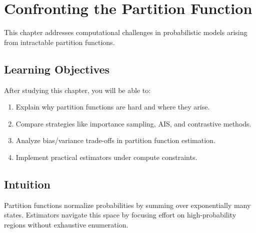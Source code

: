 
\chapter{Confronting the Partition Function}
\label{chap:partition-function}

This chapter addresses computational challenges in probabilistic models arising from intractable partition functions.


\section*{Learning Objectives}

After studying this chapter, you will be able to:

\begin{enumerate}
    \item Explain why partition functions are hard and where they arise.
    \item Compare strategies like importance sampling, AIS, and contrastive methods.
    \item Analyze bias/variance trade-offs in partition function estimation.
    \item Implement practical estimators under compute constraints.
\end{enumerate}


\section*{Intuition}

Partition functions normalize probabilities by summing over exponentially many states. Estimators navigate this space by focusing effort on high-probability regions without exhaustive enumeration.











